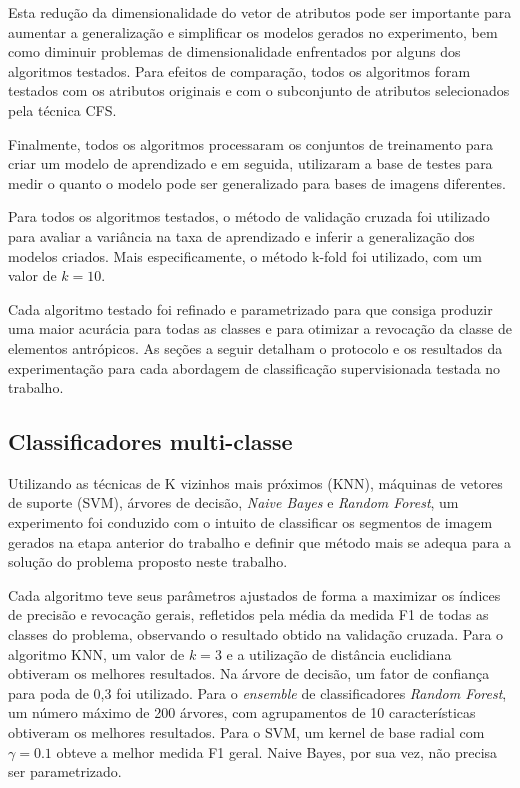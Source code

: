 Esta redução da dimensionalidade do vetor de atributos pode ser importante para aumentar a generalização e simplificar os modelos gerados no experimento, bem como diminuir problemas de dimensionalidade enfrentados por alguns dos algoritmos testados. Para efeitos de comparação, todos os algoritmos foram testados com os atributos originais e com o subconjunto de atributos selecionados pela técnica CFS.

Finalmente, todos os algoritmos processaram os conjuntos de treinamento para criar um modelo de aprendizado e em seguida, utilizaram a base de testes para medir o quanto o modelo pode ser generalizado para bases de imagens diferentes.

Para todos os algoritmos testados, o método de validação cruzada foi utilizado para avaliar a variância na taxa de aprendizado e inferir a generalização dos modelos criados. Mais especificamente, o método k-fold foi utilizado, com um valor de $k=10$.

Cada algoritmo testado foi refinado e parametrizado para que consiga produzir uma maior acurácia para todas as classes e para otimizar a revocação da classe de elementos antrópicos. As seções a seguir detalham o protocolo e os resultados da experimentação para cada abordagem de classificação supervisionada testada no trabalho.

\subsection{Classificadores multi-classe}

Utilizando as técnicas de K vizinhos mais próximos (KNN), máquinas de vetores de suporte (SVM), árvores de decisão, \textit{Naive Bayes} e \textit{Random Forest}, um experimento foi conduzido com o intuito de classificar os segmentos de imagem gerados na etapa anterior do trabalho e definir que método mais se adequa para a solução do problema proposto neste trabalho.

Cada algoritmo teve seus parâmetros ajustados de forma a maximizar os índices de precisão e revocação gerais, refletidos pela média da medida F1 de todas as classes do problema, observando o resultado obtido na validação cruzada. Para o algoritmo KNN, um valor de $k=3$ e a utilização de distância euclidiana obtiveram os melhores resultados. Na árvore de decisão, um fator de confiança para poda de 0,3 foi utilizado. Para o \textit{ensemble} de classificadores \textit{Random Forest}, um número máximo de 200 árvores, com agrupamentos de 10 características obtiveram os melhores resultados. Para o SVM, um kernel de base radial com $\gamma = 0.1$ obteve a melhor medida F1 geral. Naive Bayes, por sua vez, não precisa ser parametrizado.

